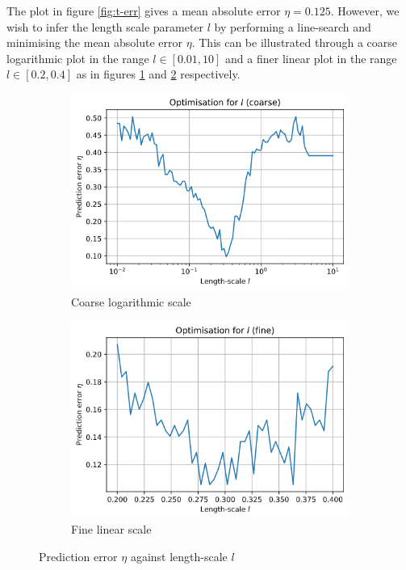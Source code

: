 \documentclass[]{article}
\begin{document}
The plot in figure \ref{fig:t-err} gives a mean absolute error $\eta=0.125$. However, we wish to infer the length scale parameter $l$ by performing a line-search and minimising the mean absolute error $\eta$. This can be illustrated through a coarse logarithmic plot in the range $l \in [0.01, 10]$ and a finer linear plot in the range $l \in [0.2, 0.4]$ as in figures \ref{fig:l-coarse} and \ref{fig:l-fine} respectively.
%
\begin{figure}[!h]
	\centering
	\begin{subfigure}{0.32\linewidth}
		\includegraphics[width=\linewidth]{l-coarse.png}
		\caption{Coarse logarithmic scale}
		\label{fig:l-coarse}
	\end{subfigure}
	\begin{subfigure}{0.31\linewidth}
		\includegraphics[width=\linewidth]{l-fine.png}
		\caption{Fine linear scale}
		\label{fig:l-fine}
	\end{subfigure}
	\caption{Prediction error $\eta$ against length-scale $l$}
	\label{fig:l-optimisation}
\end{figure}
\end{document}
